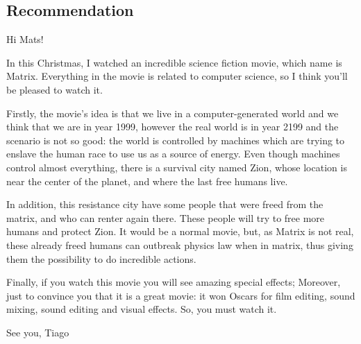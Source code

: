 \documentclass[a4paper,12pt]{article}
\begin{document}


\subsection*{Recommendation}

Hi Mats!

In this Christmas, I watched an incredible science fiction movie, which name is Matrix. Everything in the movie is related to computer science, so I think you'll be pleased to watch it.


Firstly, the movie's  idea is that we live in a  computer-generated world and we
think that we are  in year 1999, however the real world is  in year 2199 and the
scenario is not so good: the world is controlled by machines which are trying to
enslave the human  race to use us  as a source of energy.   Even though machines
control almost everything,  there is a survival city  named Zion, whose location
is near the center of the planet, and where the last free humans live.

In addition, this resistance city have some people that  were freed from the
matrix, and who  can renter again there. These people will  try to free
more humans and protect Zion. It would be a normal movie, but, as Matrix is
not real, these already freed humans can outbreak physics law when in matrix,
thus giving them the possibility to do incredible actions. 

Finally, if you watch this movie you will see amazing special effects; Moreover,
just to convince you that it is a great movie: it won  Oscars for film editing,
sound mixing, sound editing and visual effects. So, you must watch it.

See you,
Tiago
\end{document}
